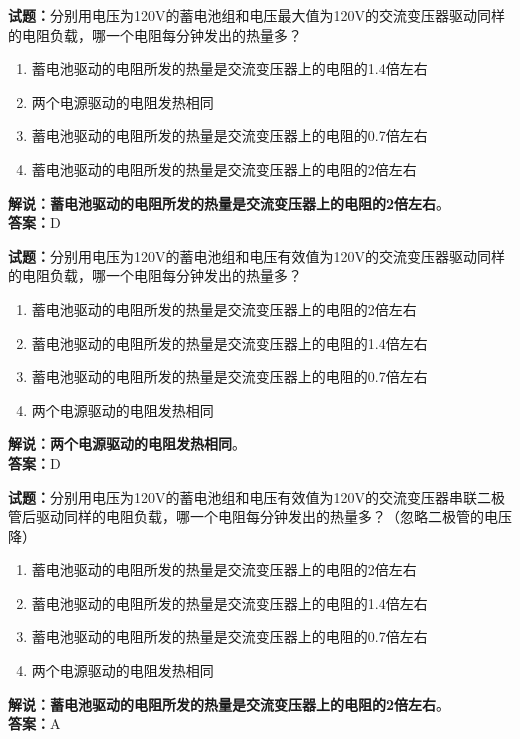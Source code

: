 \documentclass{ctexbook}
\begin{document}
\bigskip


\noindent\textbf{试题：}分别用电压为120V的蓄电池组和电压最大值为120V的交流变压器驱动同样的电阻负载，哪一个电阻每分钟发出的热量多？
\begin{enumerate}[leftmargin=3em]
\item 蓄电池驱动的电阻所发的热量是交流变压器上的电阻的1.4倍左右
\item 两个电源驱动的电阻发热相同
\item 蓄电池驱动的电阻所发的热量是交流变压器上的电阻的0.7倍左右
\item 蓄电池驱动的电阻所发的热量是交流变压器上的电阻的2倍左右
\end{enumerate}
\noindent\textbf{解说：}\textbf{蓄电池驱动的电阻所发的热量是交流变压器上的电阻的2倍左右}。\\\noindent\textbf{答案：}D



\bigskip


\noindent\textbf{试题：}分别用电压为120V的蓄电池组和电压有效值为120V的交流变压器驱动同样的电阻负载，哪一个电阻每分钟发出的热量多？
\begin{enumerate}[leftmargin=3em]
\item 蓄电池驱动的电阻所发的热量是交流变压器上的电阻的2倍左右
\item 蓄电池驱动的电阻所发的热量是交流变压器上的电阻的1.4倍左右
\item 蓄电池驱动的电阻所发的热量是交流变压器上的电阻的0.7倍左右
\item 两个电源驱动的电阻发热相同
\end{enumerate}
\noindent\textbf{解说：}\textbf{两个电源驱动的电阻发热相同}。\\\noindent\textbf{答案：}D



\bigskip


\noindent\textbf{试题：}分别用电压为120V的蓄电池组和电压有效值为120V的交流变压器串联二极管后驱动同样的电阻负载，哪一个电阻每分钟发出的热量多？（忽略二极管的电压降）
\begin{enumerate}[leftmargin=3em]
\item 蓄电池驱动的电阻所发的热量是交流变压器上的电阻的2倍左右
\item 蓄电池驱动的电阻所发的热量是交流变压器上的电阻的1.4倍左右
\item 蓄电池驱动的电阻所发的热量是交流变压器上的电阻的0.7倍左右
\item 两个电源驱动的电阻发热相同
\end{enumerate}
\noindent\textbf{解说：}\textbf{蓄电池驱动的电阻所发的热量是交流变压器上的电阻的2倍左右}。\\\noindent\textbf{答案：}A
\end{document}
